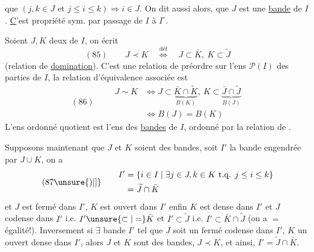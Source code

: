 
que  $(j,k\in J\text{ et }j\leq i\leq k)\Longrightarrow i\in J$. On dit aussi alors, que $J$ est une \uline{bande} de $I$. \uline{C}'est   propriété sym. par passage de $I$ à $I^\circ$.

Soient $J,K$ deux   de $I$, on écrit
\[
(85)\qquad J\prec K\quad\overset{\mathrm{déf}}{\Longleftrightarrow}\quad J\subset\bar K,\ K\subset\widetilde J
\]
(relation de \uline{domination}). C'est une relation de préordre sur l'ens $\mathcal P(I)$ des parties de $I$, la relation d'équivalence associée est
\[
(86)\qquad\begin{aligned}
J\sim K&\Longleftrightarrow J\subset\underbrace{\bar K\cap\widetilde K}_{B(K)},\ K\subset\underbrace{\bar J\cap\widetilde J}_{B(J)}\\
&\Longleftrightarrow B(J)=B(K)
\end{aligned}
\]
L'ens ordonné quotient est l'ens des \uline{bandes} de $I$, ordonné par la relation de  .

Supposons maintenant que $J$ et $K$ soient des bandes,  soit $I'$ la bande engendrée par $J\cup K$, on a
\[
(87\unsure{)|]}\qquad\begin{aligned}
I'&=\{i\in I\mid\exists j\in J,k\in K\text{ t.q. }j\leq i\leq k\}\\
&=\widetilde J\cap\bar K
\end{aligned}
\]
et $J$ est fermé dans $I'$, $K$ est ouvert dans $I'$ enfin  $K$ est dense dans $I'$ et $J$ codense dans $I'$ i.e. $I'\unsure{\subset|=}\bar K$ et $I'\subset\widetilde J$  i.e. $I'\subset\bar K\cap\widetilde J$ (on a $=$ égalité!). Inversement si $\exists$ bande $I'$ tel que $J$ soit un fermé codense dans $I'$, $K$ un ouvert dense dans $I'$, alors $J$ et $K$ sont des bandes, $J\prec K$, et ainsi, $I'=\widetilde J\cap\bar K$.
